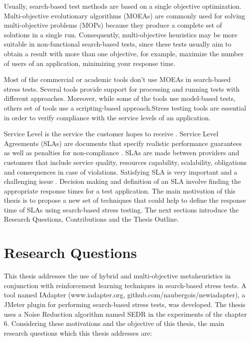 \documentclass[espaco=umemeio,chapter=TITLE,twoside,openright]{abnt}
\begin{document}
Usually, search-based test methods are based on a single objective optimization. Multi-objective evolutionary algorithms (MOEAs) are commonly used for solving multi-objective problems (MOPs) because they produce a complete set of solutions in a single run. Consequently, multi-objective heuristics may be more suitable in non-functional search-based tests, since these tests usually aim to obtain a result with more than one objective, for example, maximize the number of users of an application, minimizing your response time. 

Most of the commercial or academic tools don't use MOEAs in search-based stress tests. Several tools provide support for processing and running tests with different approaches. Moreover, while some of the tools use model-based tests, others set of tools use a scripting-based approach.Stress testing tools are essential in order to verify compliance with the service levels of an application.

Service Level is the service the customer hopes to receive \cite{Parasuraman1991}. Service Level Agreements (SLAs)  are documents that specify realistic performance guarantees as well as
penalties for non-compliance \cite{Menasce2002b}.   SLAs are made between providers and customers that include service quality, resources
capability, scalability, obligations and consequences in case of
violations. Satisfying SLA is very important and a challenging
issue \cite{Rajeshwari2016}. Decision making and definition of an SLA involve finding the appropriate response times for a test application. The main motivation of this thesis is to propose a new set of techniques that could help to define the response time of SLAs using search-based stress testing. The next sections introduce the Research Questions, Contributions and the Thesis Outline. 

\section{Research Questions}

This thesis addresses the use of hybrid and multi-objective metaheuristics in conjunction with reinforcement learning techniques in search-based stress tests. A tool named IAdapter (www.iadapter.org, github.com/naubergois/newiadapter), a JMeter plugin for performing search-based stress tests, was developed. The thesis uses a Noise Reduction algorithm named SEDR in the experiments of the chapter 6. Considering these motivations and the objective of this thesis, the main research questions which this thesis addresses are:
\end{document}
